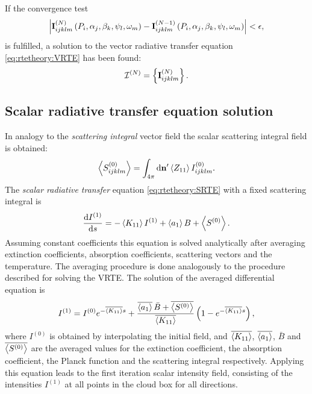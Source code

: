 If the convergence test
\begin{equation}
  \left| {\bf I}^{(N)}_{ijklm} \left( P_i, \alpha_j, \beta_k, \psi_l, \omega_m\right)  -  {\bf I}^{(N-1)}_{ijklm} \left( P_i, \alpha_j, \beta_k, \psi_l, \omega_m\right) \right|  < \mathbf{\epsilon},
\end{equation}
is fulfilled,
 a solution to the vector radiative transfer equation \eqref{eq:rtetheory:VRTE}
has been found:
\begin{equation}
  {\mathcal I}^{(N)} = \left\{ {\bf I}^{(N)}_{ijklm} \right\}. 
\end{equation}



\subsection{Scalar radiative transfer equation solution}
\label{sec:scattering:scattering:solution_rte_scalar}

In analogy to the \emph{scattering integral} vector field the scalar
scattering integral field is obtained:
\begin{equation}
  \left\langle S^{(0)}_{ijklm} \right\rangle  = \int_{4\pi} \mathrm{d} {\bf n}' \left\langle  Z_{11} \right\rangle I^{(0)}_{ijklm}.
\end{equation}
The \emph{scalar radiative transfer} equation \eqref{eq:rtetheory:SRTE} with a
fixed scattering integral is
\begin{equation}
  \label{eq:scattering:SRTE-Int}
  \frac{\mathrm{d} I^{(1)}}{\mathrm{d} s} = -\left\langle  K_{11} \right\rangle I^{(1)}
  + \left\langle a_1 \right\rangle B +\left\langle S^{(0)} \right\rangle.
\end{equation}
Assuming constant coefficients this equation is solved analytically
after averaging extinction coefficients, absorption coefficients,
scattering vectors and the temperature. The averaging procedure is done
analogously to the procedure described for solving the VRTE.  The
solution of the averaged differential equation is
\begin{equation}
\label{eq:scattering:SRTE_sol}
  I^{(1)} = I^{(0)} e^{-\overline{\left\langle K_{11} \right\rangle} s} +
  \frac{\overline{\left\langle a_1 \right\rangle}\, 
    \bar{B} + \overline{\left\langle  S^{(0)} \right\rangle} }
  {\overline{\left\langle  K_{11} \right\rangle} }
  \left(1-e^{-\overline{\left\langle K_{11} \right\rangle} s}\right),
\end{equation}
where $I^{(0)}$ is obtained by interpolating the initial field, and
$\overline{\left\langle K_{11} \right\rangle}$, $\overline{\left\langle a_1 \right\rangle}$,
$\bar{B}$ and $\overline{\left\langle S^{(0)} \right\rangle}$ are the
averaged values for the extinction coefficient, the absorption
coefficient, the 
Planck function and the scattering integral respectively.  Applying
this equation leads to the first iteration scalar intensity field,
consisting of the intensities $I^{(1)}$ at all points in the cloud box
for all directions.
  
